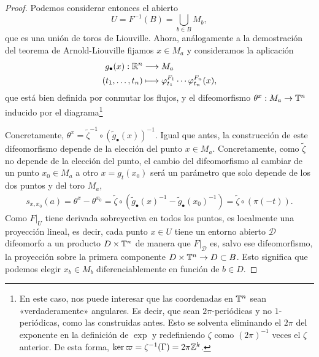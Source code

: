 \begin{proof}
  Podemos considerar entonces el abierto 
  \begin{equation*}
    U=F^{-1}(B)=\bigcup_{b\in B}M_b,
  \end{equation*}
  que es una unión de toros de Liouville. Ahora, análogamente a la demostración del teorema de Arnold-Liouville fijamos $x\in M_a$ y consideramos la aplicación
  \begin{align*}
    g_\bullet (x) :\mathbb{R}^n&\longrightarrow M_a\\ 
    (t_1,\dots,t_n) &\longmapsto \varphi_{t_1}^{F_1}\cdots \varphi_{t_n}^{F_n}(x), 
    \end{align*}
    que está bien definida por conmutar los flujos, y el difeomorfismo $\theta^x:M_a\rightarrow \mathbb{T}^n$ inducido por el diagrama\footnote{En este caso, nos puede interesar que las coordenadas en $\mathbb{T}^n$ sean «verdaderamente» angulares. Es decir, que sean $2\pi$-periódicas y no $1$-periódicas, como las construidas antes. Esto se solventa eliminando el $2\pi$ del exponente en la definición de $\exp$ y redefiniendo $\zeta$ como $(2\pi)^{-1}$ veces el $\zeta$ anterior. De esta forma, $\ker{\varpi}=\zeta^{-1}(\Gamma)=2\pi \mathbb{Z}^k$.}
  \begin{center}
   \end{center}
     Concretamente, $\theta^x=\tilde{\zeta}^{-1}\circ (\tilde{g}_\bullet(x))^{-1}$. Igual que antes, la construcción de este difeomorfismo depende de la elección del punto $x\in M_a$. Concretamente, como $\tilde{\zeta}$ no depende de la elección del punto, el cambio del difeomorfismo al cambiar de un punto $x_0\in M_a$ a otro $x=g_t(x_0)$ será un parámetro que solo depende de los dos puntos y del toro $M_a$,
     \begin{align*}
       s_{x,x_0}(a)=\theta^x-\theta^{x_0}=\tilde{\zeta}\circ (\tilde{g}_\bullet(x)^{-1}-\tilde{g}_\bullet(x_0)^{-1}) = \tilde{\zeta} \circ (\pi(-t)).
     \end{align*}
     Como $F|_{U}$ tiene derivada sobreyectiva en todos los puntos, es localmente una proyección lineal, es decir, cada punto $x\in U$ tiene un entorno abierto $\mathscr{D}$ difeomorfo a un producto $D\times \mathbb{T}^n$ de manera que $F|_{\mathscr{D}}$ es, salvo ese difeomorfismo, la proyección sobre la primera componente $D\times \mathbb{T}^n \rightarrow D\subset B$. Esto significa que podemos elegir $x_b\in M_b$ diferenciablemente en función de $b\in D$. 

\end{proof}
